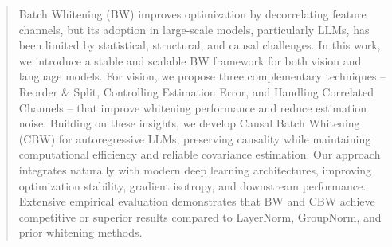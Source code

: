 \begin{abstract}


Batch Whitening (BW) improves optimization by decorrelating feature channels, but its adoption in large-scale models, particularly LLMs, has been limited by statistical, structural, and causal challenges.
In this work, we introduce a stable and scalable BW framework for both vision and language models.
For vision, we propose three complementary techniques -- Reorder \& Split, Controlling Estimation Error, and Handling Correlated Channels -- that improve whitening performance and reduce estimation noise.
Building on these insights, we develop Causal Batch Whitening (CBW) for autoregressive LLMs, preserving causality while maintaining computational efficiency and reliable covariance estimation.
Our approach integrates naturally with modern deep learning architectures, improving optimization stability, gradient isotropy, and downstream performance.
Extensive empirical evaluation demonstrates that BW and CBW achieve competitive or superior results compared to LayerNorm, GroupNorm, and prior whitening methods.


\end{abstract}